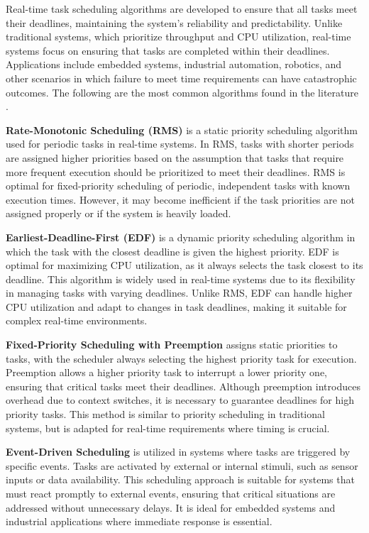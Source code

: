 Real-time task scheduling algorithms are developed to ensure that all tasks meet their deadlines, maintaining the system's reliability and predictability. Unlike traditional systems, which prioritize throughput and CPU utilization, real-time systems focus on ensuring that tasks are completed within their deadlines. Applications include embedded systems, industrial automation, robotics, and other scenarios in which failure to meet time requirements can have catastrophic outcomes. The following are the most common algorithms found in the literature \cite{abdullah2023real, pandit2013, davis2011, silberschatz2018, Buttazzo2020}.


\textbf{Rate-Monotonic Scheduling (RMS)} is a static priority scheduling algorithm used for periodic tasks in real-time systems. In RMS, tasks with shorter periods are assigned higher priorities based on the assumption that tasks that require more frequent execution should be prioritized to meet their deadlines. RMS is optimal for fixed-priority scheduling of periodic, independent tasks with known execution times. However, it may become inefficient if the task priorities are not assigned properly or if the system is heavily loaded.


\textbf{Earliest-Deadline-First (EDF)} is a dynamic priority scheduling algorithm in which the task with the closest deadline is given the highest priority. EDF is optimal for maximizing CPU utilization, as it always selects the task closest to its deadline. This algorithm is widely used in real-time systems due to its flexibility in managing tasks with varying deadlines. Unlike RMS, EDF can handle higher CPU utilization and adapt to changes in task deadlines, making it suitable for complex real-time environments.


\textbf{Fixed-Priority Scheduling with Preemption} assigns static priorities to tasks, with the scheduler always selecting the highest priority task for execution. Preemption allows a higher priority task to interrupt a lower priority one, ensuring that critical tasks meet their deadlines. Although preemption introduces overhead due to context switches, it is necessary to guarantee deadlines for high priority tasks. This method is similar to priority scheduling in traditional systems, but is adapted for real-time requirements where timing is crucial.


\textbf{Event-Driven Scheduling} is utilized in systems where tasks are triggered by specific events. Tasks are activated by external or internal stimuli, such as sensor inputs or data availability. This scheduling approach is suitable for systems that must react promptly to external events, ensuring that critical situations are addressed without unnecessary delays. It is ideal for embedded systems and industrial applications where immediate response is essential.

